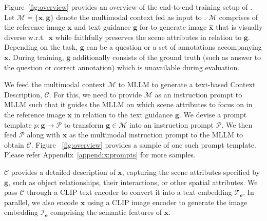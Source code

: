 
Figure~\ref{fig:overview} provides an overview of the end-to-end training setup of \method. Let $\mathcal{M} = \{\mathbf{x}, \mathbf{g}\}$ denote the multimodal context fed as input to \method. $\mathcal{M}$ comprises of the reference image $\mathbf{x}$ and text guidance $\mathbf{g}$ for \method to generate image $\mathbf{\hat{x}}$ that is visually diverse w.r.t.~$\mathbf{x}$ while faithfully preserves the scene attributes in relation to $\mathbf{g}$. Depending on the task, $\mathbf{g}$ can be a question or a set of annotations accompanying $\mathbf{x}$. During training, $\mathbf{g}$ additionally consists of the ground truth (such as answer to the question or correct annotation) which is unavailable during evaluation.  

We feed the multimodal context $\mathcal{M}$ to MLLM to generate a text-based Context Description, $\mathcal{C}$. For this, we need to provide $\mathcal{M}$ as an instruction prompt to MLLM such that it guides the MLLM on which scene attributes to focus on in the reference image $\mathbf{x}$ in relation to the text guidance $\mathbf{g}$. We devise a prompt template $p:\mathbf{g} \rightarrow \mathcal{P}$ to transform $\mathbf{g} \in \mathcal{M}$ into an instruction prompt $\mathcal{P}$. We then feed $\mathcal{P}$ along with $\mathbf{x}$ as the multimodal instruction prompt to the MLLM to obtain $\mathcal{C}$. Figure ~\ref{fig:overview} provides a sample of one such prompt template. Please refer Appendix~\ref{appendix:prompts} for more samples.

$\mathcal{C}$ provides a detailed description of $\mathbf{x}$, capturing the scene attributes specified by $\mathbf{g}$, such as object relationships, their interactions, or other spatial attributes. We pass $\mathcal{C}$ through a CLIP text encoder \citep{radford2021learning} to convert it into a text embedding $\mathcal{T}_\mathbf{e}$. In parallel, we also encode $\mathbf{x}$ using a CLIP image encoder 
to generate the image embedding $\mathcal{I}_\mathbf{e}$ comprising the semantic features of $\mathbf{x}$.

